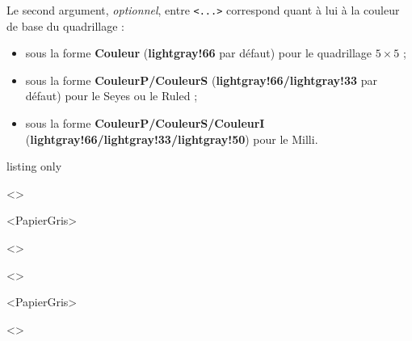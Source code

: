 \documentclass[a4paper]{article}
\newcommand\Cle[1]{{\bfseries\sffamily\textlangle #1\textrangle}}
\begin{document}
Le second argument, \textit{optionnel}, entre \texttt{<...>} correspond quant à lui à la couleur de base du quadrillage :

\begin{itemize}
	\item sous la forme \Cle{Couleur} (\Cle{lightgray!66} par défaut) pour le quadrillage $5\times5$ ;
	\item sous la forme \Cle{CouleurP/CouleurS} (\Cle{lightgray!66/lightgray!33} par défaut) pour le Seyes ou le Ruled ;
	\item sous la forme \Cle{CouleurP/CouleurS/CouleurI} (\Cle{lightgray!66/lightgray!33/lightgray!50}) pour le Milli.
\end{itemize}

\medskip

\begin{PresentationCode}{listing only}

\begin{EnvQuadrillage}[NbCarreaux=18x4,Grille=Seyes,Marge=3]<\CoulSeyes>
\end{EnvQuadrillage}

\begin{EnvQuadrillage}[NbCarreaux=36x8,Elargir=3/3]<PapierGris>
\end{EnvQuadrillage}

\begin{center}
	\begin{EnvQuadrillage}[NbCarreaux=12x3,Elargir=2/2,Grille=Ruled,Marge=2]<\CoulRuled>
	\end{EnvQuadrillage}
\end{center}
\end{PresentationCode}

\medskip

\begin{EnvQuadrillage}[NbCarreaux=18x4,Grille=Seyes,Marge=3]<\CoulSeyes>
\end{EnvQuadrillage}

\smallskip

\begin{EnvQuadrillage}[NbCarreaux=36x8,Elargir=3/3,Cadre]<PapierGris>
\end{EnvQuadrillage}

\begin{center}
	\begin{EnvQuadrillage}[NbCarreaux=12x3,Grille=Ruled,Marge=2]<\CoulRuled>
\end{EnvQuadrillage}
\end{center}
\end{document}
